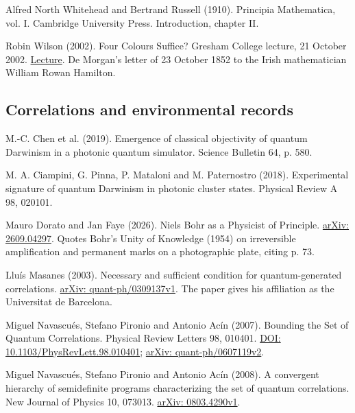 \documentclass[11pt,twoside]{article}
\theoremstyle{thielethm}
\theoremstyle{thieledef}
\theoremstyle{thieledef}
\theoremstyle{thieledef}
\theoremstyle{thielethm}
\theoremstyle{thieleobs}
\theoremstyle{thielethm}
\begin{document}
\noindent Alfred North Whitehead and Bertrand Russell (1910). Principia Mathematica, vol. I. Cambridge University Press. Introduction, chapter II.
\par\medskip

\noindent Robin Wilson (2002). Four Colours Suffice? Gresham College lecture, 21 October 2002. \href{https://www.gresham.ac.uk/node/11353}{Lecture}. De Morgan's letter of 23 October 1852 to the Irish mathematician William Rowan Hamilton.
\par\medskip

\subsection{Correlations and environmental records}



\noindent M.-C. Chen et al. (2019). Emergence of classical objectivity of quantum Darwinism in a photonic quantum simulator. Science Bulletin 64, p. 580.
\par\medskip

\noindent M. A. Ciampini, G. Pinna, P. Mataloni and M. Paternostro (2018). Experimental signature of quantum Darwinism in photonic cluster states. Physical Review A 98, 020101.
\par\medskip

\noindent Mauro Dorato and Jan Faye (2026). Niels Bohr as a Physicist of Principle. \href{https://arxiv.org/abs/2609.04297}{arXiv: 2609.04297}. Quotes Bohr's Unity of Knowledge (1954) on irreversible amplification and permanent marks on a photographic plate, citing p. 73.
\par\medskip

\noindent Lluís Masanes (2003). Necessary and sufficient condition for quantum-generated correlations. \href{https://arxiv.org/abs/quant-ph/0309137v1}{arXiv: quant-ph/0309137v1}. The paper gives his affiliation as the Universitat de Barcelona.
\par\medskip

\noindent Miguel Navascués, Stefano Pironio and Antonio Acín (2007). Bounding the Set of Quantum Correlations. Physical Review Letters 98, 010401. \href{https://doi.org/10.1103/PhysRevLett.98.010401}{DOI: 10.1103/PhysRevLett.98.010401}; \href{https://arxiv.org/abs/quant-ph/0607119v2}{arXiv: quant-ph/0607119v2}.
\par\medskip

\noindent Miguel Navascués, Stefano Pironio and Antonio Acín (2008). A convergent hierarchy of semidefinite programs characterizing the set of quantum correlations. New Journal of Physics 10, 073013. \href{https://arxiv.org/abs/0803.4290v1}{arXiv: 0803.4290v1}.
\par\medskip
\end{document}
